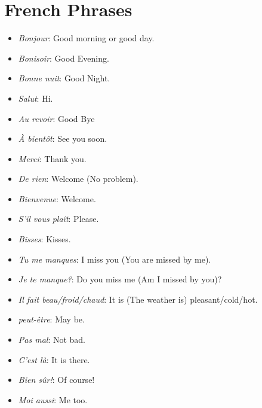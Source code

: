 \section{French Phrases}

\begin{itemize}

\item{\emph{Bonjour}: Good morning or good day.} 

\item{\emph{Bonisoir}: Good Evening.} 

\item{\emph{Bonne nuit}: Good Night.} 

\item{\emph{Salut}: Hi.} 

\item{\emph{Au revoir}: Good Bye} 

\item{\emph{\`{A} bient\^{o}t}: See you soon.} 

\item{\emph{Merci}: Thank you.} 

\item{\emph{De rien}: Welcome (No problem).} 

\item{\emph{Bienvenue}: Welcome.}

\item{\emph{S'il vous pla\^it}: Please.} 

\item{\emph{Bisses}: Kisses.} 

\item{\emph{Tu me manques}: I miss you (You are missed by me).} 

\item{\emph{Je te manque?}: Do you miss me (Am I missed by you)?} 

\item{\emph{Il fait beau/froid/chaud}: It is (The weather is)
pleasant/cold/hot.} 

\item{\emph{peut-\^etre}: May be.} 

\item{\emph{Pas mal}: Not bad.} 

\item{\emph{C'est l\`a}: It is there.}

\item{\emph{Bien s\^ur!}: Of course!} 

\item{\emph{Moi aussi}: Me too.} 


\end{itemize}
